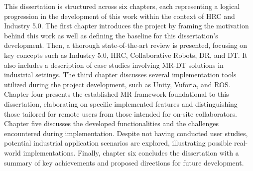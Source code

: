 This dissertation is structured across six chapters, each representing a logical progression in the development of this work within the context of \ac{HRC} and Industry 5.0. The first chapter introduces the project by framing the motivation behind this work as well as defining the baseline for this dissertation's development. Then, a thorough state-of-the-art review is presented, focusing on key concepts such as Industry 5.0, \ac{HRC}, Collaborative Robots, \ac{DR}, and \ac{DT}. It also includes a description of case studies involving \ac{MR}-\ac{DT} solutions in industrial settings. The third chapter discusses several implementation tools utilized during the project development, such as Unity, Vuforia, and \ac{ROS}. Chapter four presents the established \ac{MR} framework foundational to this dissertation, elaborating on specific implemented features and distinguishing those tailored for remote users from those intended for on-site collaborators. Chapter five discusses the developed functionalities and the challenges encountered during implementation. Despite not having conducted user studies, potential industrial application scenarios are explored, illustrating possible real-world implementations. Finally, chapter six concludes the dissertation with a summary of key achievements and proposed directions for future development.





